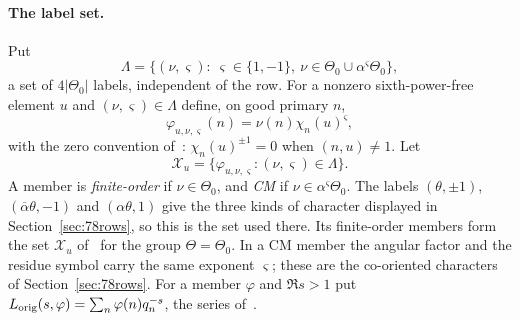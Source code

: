 \documentclass[11pt]{article}
\numberwithin{equation}{section}
\begin{document}
\paragraph{The label set.} Put
\begin{equation}\label{eq:d162}
 \Lambda=\bigl\{(\nu,\varsigma):\ \varsigma\in\{1,-1\},\ \nu\in\Theta_0\cup\alpha^{\varsigma}\Theta_0\bigr\},
\end{equation}
a set of $4|\Theta_0|$ labels, independent of the row. For a nonzero sixth-power-free element $u$
and $(\nu,\varsigma)\in\Lambda$ define, on good primary $n$,
\begin{equation}\label{eq:d163}
 \varphi_{u,\nu,\varsigma}(n)=\nu(n)\chi_n(u)^{\varsigma},
\end{equation}
with the zero convention of~\cite[Section~4.1]{OAI78}: $\chi_n(u)^{\pm1}=0$ when $(n,u)\ne1$. Let
\begin{equation}\label{eq:d164}
 \mathcal X_u=\{\varphi_{u,\nu,\varsigma}:(\nu,\varsigma)\in\Lambda\}.
\end{equation}
A member is \emph{finite-order} if $\nu\in\Theta_0$, and \emph{CM} if $\nu\in\alpha^\varsigma\Theta_0$.
The labels $(\theta,\pm1)$, $(\overline\alpha\theta,-1)$ and $(\alpha\theta,1)$ give the three kinds of
character displayed in Section~\ref{sec:78rows}, so this is the set used there. Its finite-order
members form the set $\mathcal X_u$ of~\cite[Section~8.1]{OAI78} for the group $\Theta=\Theta_0$. In a
CM member the angular factor and the residue symbol carry the same exponent $\varsigma$; these are
the co-oriented characters of Section~\ref{sec:78rows}. For a member $\varphi$ and $\Re s>1$ put
$L_{\rm orig}(s,\varphi)=\sum_n\varphi(n)q_n^{-s}$, the series of~\cite[Section~8.1]{OAI78}.
\end{document}
